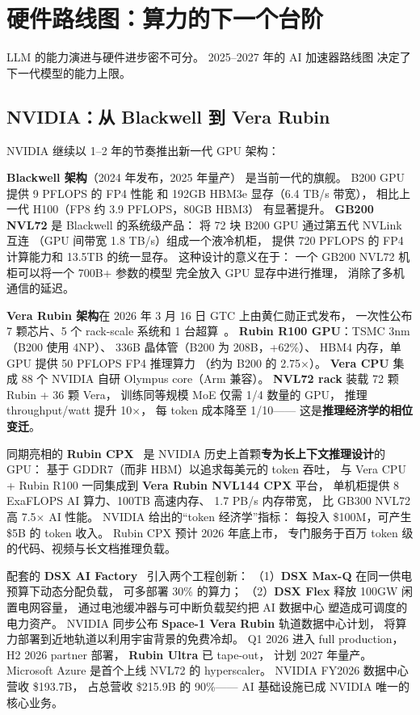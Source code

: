 \section{硬件路线图：算力的下一个台阶}
\label{sec:hardware-roadmap}

LLM 的能力演进与硬件进步密不可分。
2025--2027 年的 AI 加速器路线图
决定了下一代模型的能力上限。

\subsection{NVIDIA：从 Blackwell 到 Vera Rubin}

NVIDIA 继续以 1--2 年的节奏推出新一代 GPU 架构：

\textbf{Blackwell 架构}（2024 年发布，2025 年量产）
是当前一代的旗舰。
B200 GPU 提供 9 PFLOPS 的 FP4 性能
和 192GB HBM3e 显存（6.4 TB/s 带宽），
相比上一代 H100（FP8 约 3.9 PFLOPS，80GB HBM3）
有显著提升。
\textbf{GB200 NVL72} 是 Blackwell 的系统级产品：
将 72 块 B200 GPU 通过第五代 NVLink 互连
（GPU 间带宽 1.8 TB/s）组成一个液冷机柜，
提供 720 PFLOPS 的 FP4 计算能力和 13.5TB 的统一显存。
这种设计的意义在于：
一个 GB200 NVL72 机柜可以将一个 700B+ 参数的模型
完全放入 GPU 显存中进行推理，
消除了多机通信的延迟。

\textbf{Vera Rubin 架构}在 2026 年 3 月 16 日 GTC 上由黄仁勋正式发布，
一次性公布 7 颗芯片、5 个 rack-scale 系统和 1 台超算~\cite{nvidia_vera_rubin_2026}。
\textbf{Rubin R100 GPU}：TSMC 3nm（B200 使用 4NP）、
336B 晶体管（B200 为 208B，+62\%）、
HBM4 内存，单 GPU 提供 50 PFLOPS FP4 推理算力
（约为 B200 的 2.75$\times$）。
\textbf{Vera CPU} 集成 88 个 NVIDIA 自研 Olympus core（Arm 兼容）。
\textbf{NVL72 rack} 装载 72 颗 Rubin + 36 颗 Vera，
训练同等规模 MoE 仅需 1/4 数量的 GPU，
推理 throughput/watt 提升 10$\times$，
每 token 成本降至 1/10——
这是\textbf{推理经济学的相位变迁}。

同期亮相的 \textbf{Rubin CPX}~\cite{nvidia_rubin_cpx_2025}
是 NVIDIA 历史上首颗\textbf{专为长上下文推理设计}的 GPU：
基于 GDDR7（而非 HBM）以追求每美元的 token 吞吐，
与 Vera CPU + Rubin R100 一同集成到 \textbf{Vera Rubin NVL144 CPX} 平台，
单机柜提供 8 ExaFLOPS AI 算力、100TB 高速内存、
1.7 PB/s 内存带宽，
比 GB300 NVL72 高 7.5$\times$ AI 性能。
NVIDIA 给出的“token 经济学”指标：
每投入 \$100M，可产生 \$5B 的 token 收入。
Rubin CPX 预计 2026 年底上市，
专门服务于百万 token 级的代码、视频与长文档推理负载。

配套的 \textbf{DSX AI Factory}~\cite{nvidia_dsx_factory_2026}
引入两个工程创新：
（1）\textbf{DSX Max-Q} 在同一供电预算下动态分配负载，
可多部署 30\% 的算力；
（2）\textbf{DSX Flex} 释放 100GW 闲置电网容量，
通过电池缓冲器与可中断负载契约把 AI 数据中心
塑造成可调度的电力资产。
NVIDIA 同步公布 \textbf{Space-1 Vera Rubin} 轨道数据中心计划，
将算力部署到近地轨道以利用宇宙背景的免费冷却。
Q1 2026 进入 full production，
H2 2026 partner 部署，
\textbf{Rubin Ultra} 已 tape-out，
计划 2027 年量产。
Microsoft Azure 是首个上线 NVL72 的 hyperscaler。
NVIDIA FY2026 数据中心营收 \$193.7B，
占总营收 \$215.9B 的 90\%——
AI 基础设施已成 NVIDIA 唯一的核心业务。

